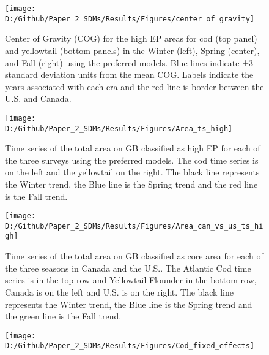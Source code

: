 \documentclass[
]{article}
\begin{document}
\begin{landscape}
\newpage
\begin{figure}[htb]

{\centering \texttt{[image: D:/Github/Paper\_2\_SDMs/Results/Figures/center\_of\_gravity]} 

}

\caption{Center of Gravity (COG) for the high EP areas for cod (top panel) and yellowtail (bottom panels) in the Winter (left), Spring (center), and Fall (right) using the preferred models.  Blue lines indicate ±3 standard deviation units from the mean COG. Labels indicate the years associated with each era and the red line is border between the U.S. and Canada.}\label{fig:cog-hep}
\end{figure}

\newpage
\begin{figure}[htb]

{\centering \texttt{[image: D:/Github/Paper\_2\_SDMs/Results/Figures/Area\_ts\_high]} 

}

\caption{Time series of the total area on GB classified as high EP for each of the three surveys using the preferred models.  The cod time series is on the left and the yellowtail on the right.  The black line represents the Winter trend, the Blue line is the Spring trend and the red line is the Fall trend.  }\label{fig:area-hep}
\end{figure}

\newpage
\begin{figure}[htb]

{\centering \texttt{[image: D:/Github/Paper\_2\_SDMs/Results/Figures/Area\_can\_vs\_us\_ts\_high]} 

}

\caption{Time series of the total area on GB classified as core area for each of the three seasons in Canada and the U.S..  The Atlantic Cod time series is in the top row and Yellowtail Flounder in the bottom row, Canada is on the left and U.S. is on the right.  The black line represents the Winter trend, the Blue line is the Spring trend and the green line is the Fall trend.  }\label{fig:area-can-vs-us-hep}
\end{figure}

\newpage
\begin{figure}[htb]

{\centering \texttt{[image: D:/Github/Paper\_2\_SDMs/Results/Figures/Cod\_fixed\_effects]} 

}
\end{figure}
\end{landscape}
\end{document}
